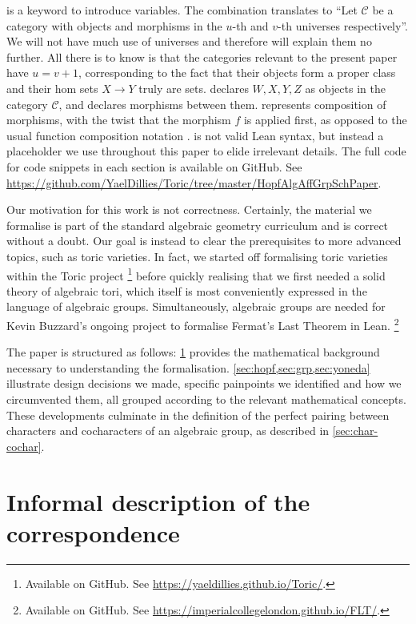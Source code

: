 \documentclass{article}
\newcommand{\mcC}{\mathcal C}
\begin{document}
 is a keyword to introduce variables.
The combination  translates to ``Let $\mcC$ be a category with objects and morphisms in the $u$-th and $v$-th universes respectively''.
We will not have much use of universes and therefore will explain them no further.
All there is to know is that the categories relevant to the present paper have $u = v + 1$, corresponding to the fact that their objects form a proper class and their hom sets $X \to Y$ truly are sets.
 declares $W, X, Y, Z$ as objects in the category $\mcC$, and  declares morphisms between them.
 represents composition of morphisms, with the twist that the morphism $f$ is applied first, as opposed to the usual function composition notation .
 is not valid Lean syntax, but instead a placeholder we use throughout this paper to elide irrelevant details.
The full code for code snippets in each section is available on GitHub. See \url{https://github.com/YaelDillies/Toric/tree/master/HopfAlgAffGrpSchPaper}.

Our motivation for this work is not correctness.
Certainly, the material we formalise is part of the standard algebraic geometry curriculum and is correct without a doubt.
Our goal is instead to clear the prerequisites to more advanced topics, such as toric varieties.
In fact, we started off formalising toric varieties within the Toric project
\footnote{Available on GitHub. See \url{https://yaeldillies.github.io/Toric/}.}
before quickly realising that we first needed a solid theory of algebraic tori, which itself is most conveniently expressed in the language of algebraic groups.
Simultaneously, algebraic groups are needed for Kevin Buzzard's ongoing project to formalise Fermat's Last Theorem in Lean.
\footnote{Available on GitHub. See \url{https://imperialcollegelondon.github.io/FLT/}.}

The paper is structured as follows:
\cref{sec:informal} provides the mathematical background necessary to understanding the formalisation.
\cref{sec:hopf,sec:grp,sec:yoneda} illustrate design decisions we made, specific painpoints we identified and how we circumvented them, all grouped according to the relevant mathematical concepts.
These developments culminate in the definition of the perfect pairing between characters and cocharacters of an algebraic group, as described in \cref{sec:char-cochar}.


\section{Informal description of the correspondence}\label{sec:informal}
\end{document}
